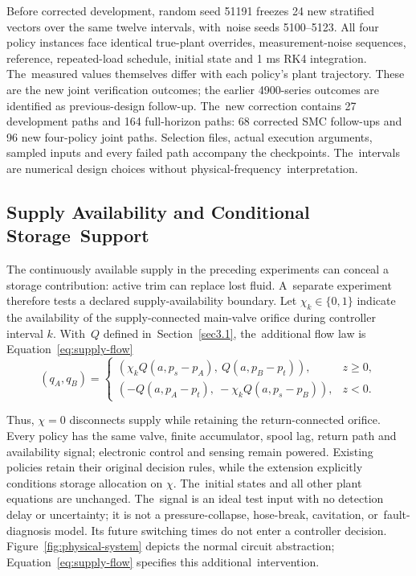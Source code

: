 \documentclass[machines,article,submit,pdftex,moreauthors]{Definitions/mdpi}
\begin{document}
Before corrected development, random seed 51191 freezes 24 new stratified vectors over the same twelve intervals, with~noise seeds 5100--5123. All four policy instances face identical true-plant overrides, measurement-noise sequences, reference, repeated-load schedule, initial state and 1 ms RK4 integration. The~measured values themselves differ with each policy's plant trajectory. These are the new joint verification outcomes; the earlier 4900-series outcomes are identified as previous-design follow-up. The~new correction contains 27 development paths and 164 full-horizon paths: 68 corrected SMC follow-ups and 96 new four-policy joint paths. Selection files, actual execution arguments, sampled inputs and every failed path accompany the checkpoints. The~intervals are numerical design choices without physical-frequency~interpretation.


\subsection{Supply Availability and Conditional Storage~Support}\label{sec:supply-method}
The continuously available supply in the preceding experiments can conceal a storage contribution: active trim can replace lost fluid. A~separate experiment therefore tests a declared supply-availability boundary. Let $\chi_k\in\{0,1\}$ indicate the availability of the supply-connected main-valve orifice during controller interval $k$. With~$Q$ defined \mbox{in Section~\ref{sec3.1}}, the~additional flow law is Equation~\eqref{eq:supply-flow}
\begin{equation}
 (q_A,q_B)=
 \begin{cases}
 (\chi_k Q(a,p_s-p_A),\ Q(a,p_B-p_t)),&z\ge0,\\
 (-Q(a,p_A-p_t),\ -\chi_k Q(a,p_s-p_B)),&z<0.
 \end{cases}\label{eq:supply-flow}
\end{equation}

Thus, $\chi=0$ disconnects supply while retaining the return-connected orifice. Every policy has the same valve, finite accumulator, spool lag, return path and availability signal; electronic control and sensing remain powered. Existing policies retain their original decision rules, while the extension explicitly conditions storage allocation on $\chi$. The~initial states and all other plant equations are unchanged. The~signal is an ideal test input with no detection delay or uncertainty; it is not a pressure-collapse, hose-break, cavitation, or~fault-diagnosis model. Its future switching times do not enter a controller decision. Figure~\ref{fig:physical-system} depicts the normal circuit abstraction; Equation~\eqref{eq:supply-flow} specifies this additional~intervention.
\end{document}

